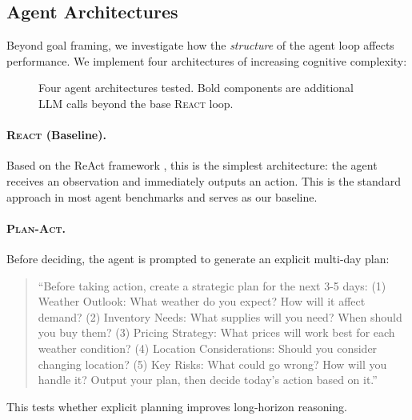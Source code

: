 \subsection{Agent Architectures}
\label{sec:architectures}

Beyond goal framing, we investigate how the \emph{structure} of the agent loop affects performance. We implement four architectures of increasing cognitive complexity:

\begin{figure}[h]
\centering
{}
\caption{Four agent architectures tested. Bold components are additional LLM calls beyond the base \textsc{React} loop.}
\label{fig:architectures}
\end{figure}

\paragraph{\textsc{React} (Baseline).}
Based on the ReAct framework \citep{yao2023react}, this is the simplest architecture: the agent receives an observation and immediately outputs an action. This is the standard approach in most agent benchmarks and serves as our baseline.

\paragraph{\textsc{Plan-Act}.}
Before deciding, the agent is prompted to generate an explicit multi-day plan:
\begin{quote}
\small\ttfamily
``Before taking action, create a strategic plan for the next 3-5 days: (1) Weather Outlook: What weather do you expect? How will it affect demand? (2) Inventory Needs: What supplies will you need? When should you buy them? (3) Pricing Strategy: What prices will work best for each weather condition? (4) Location Considerations: Should you consider changing location? (5) Key Risks: What could go wrong? How will you handle it? Output your plan, then decide today's action based on it.''
\end{quote}
This tests whether explicit planning improves long-horizon reasoning.


